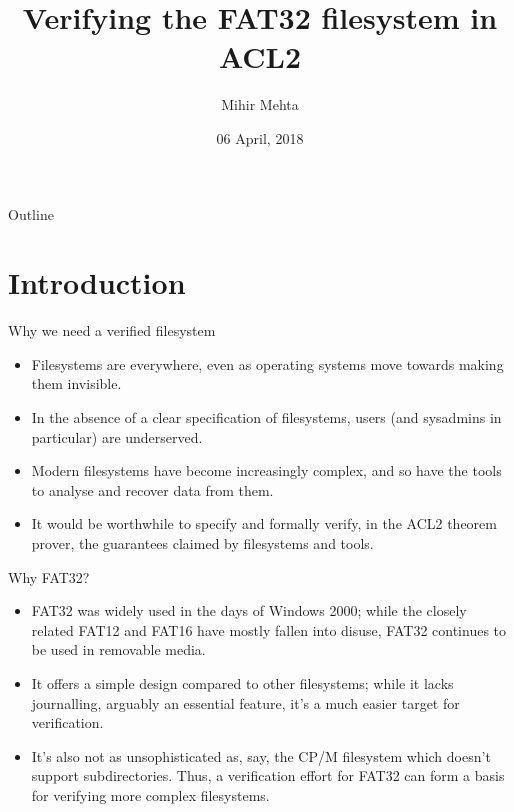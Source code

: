 \documentclass{beamer}
\title{Verifying the FAT32 filesystem in ACL2}
\author{Mihir Mehta}
\institute{
  Department of Computer Science\\
  University of Texas at Austin\\[1ex]
  \texttt{mihir@cs.utexas.edu}
}
\date{06 April, 2018}
\begin{document}
\begin{frame}[plain]
  \titlepage
\end{frame}

\begin{frame}{Outline}
  \tableofcontents
\end{frame}


\section{Introduction}

\begin{frame}{Why we need a verified filesystem}
  \begin{itemize}
  \item Filesystems are everywhere, even as operating systems move
    towards making them invisible.
  \item In the absence of a clear specification of filesystems, users
    (and sysadmins in particular) are underserved.
  \item Modern filesystems have become increasingly complex, and so
    have the tools to analyse and recover data from them.
  \item It would be worthwhile to specify and formally verify, in the
    ACL2 theorem prover, the guarantees claimed by filesystems and tools.
  \end{itemize}
\end{frame}

\begin{frame}{Why FAT32?}
  \begin{itemize}
  \item FAT32 was widely used in the days of Windows 2000; while the
    closely related FAT12 and FAT16 have mostly fallen into disuse,
    FAT32 continues to be used in removable media.
  \item It offers a simple design compared to other filesystems; while
    it lacks journalling, arguably an essential feature, it's a much
    easier target for verification.
  \item It's also not as unsophisticated as, say, the CP/M filesystem
    which doesn't support subdirectories. Thus, a verification effort
    for FAT32 can form a basis for verifying more complex filesystems.
  \end{itemize}
\end{frame}
\end{document}
